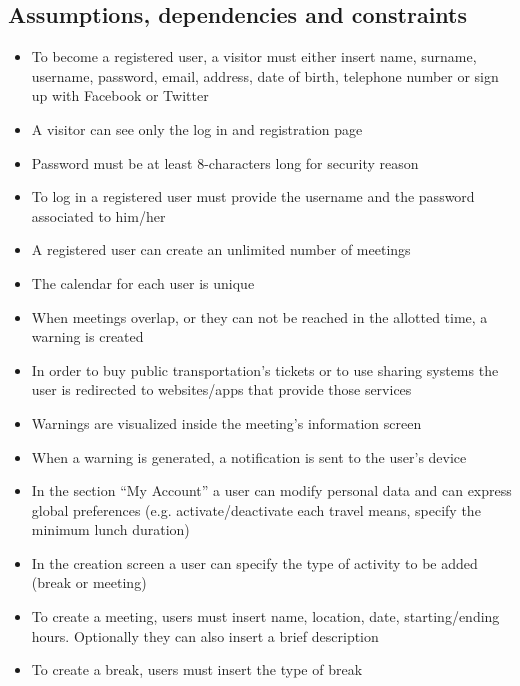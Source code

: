 \documentclass[12pt,titlepage]{article}
\begin{document}
\subsection{Assumptions, dependencies and constraints}\label{sec:mod1}
\begin{itemize}
\item To become a registered user, a visitor must either insert name, surname, username, password, email, address, date of birth, telephone number or sign up with Facebook or Twitter
\item A visitor can see only the log in and registration page
\item Password must be at least 8-characters long for security reason
\item To log in a registered user must provide the username and the password associated to him/her
\item A registered user can create an unlimited number of meetings
\item The calendar for each user is unique
\item When meetings overlap, or they can not be reached in the allotted time, a warning is created
\item In order to buy public transportation's tickets or to use sharing systems the user is redirected to websites/apps that provide those services
\item Warnings are visualized inside the meeting's information screen
\item When a warning is generated, a notification is sent to the user's device 
\item In the section ``My Account'' a user can modify personal data and can express global preferences (e.g. activate/deactivate each travel means, specify the minimum lunch duration)
\item In the creation screen a user can specify the type of activity to be added (break or meeting)
\item To create a meeting, users must insert name, location, date, starting/ending hours. Optionally they can also insert a brief description 
\item To create a break, users must insert the type of break
\end{itemize}
\end{document}
